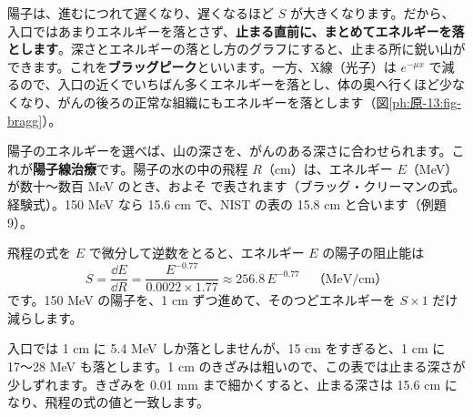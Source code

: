 陽子は、進むにつれて遅くなり、遅くなるほど $S$ が大きくなります。だから、入口ではあまりエネルギーを落とさず、\textbf{止まる直前に、まとめてエネルギーを落とします}。深さとエネルギーの落とし方のグラフにすると、止まる所に鋭い山ができます。これを\textbf{ブラッグピーク}といいます。一方、X線（光子）は $e^{-\mu x}$ で減るので、入口の近くでいちばん多くエネルギーを落とし、体の奥へ行くほど少なくなり、がんの後ろの正常な組織にもエネルギーを落とします（図\ref{ph:原-13:fig-bragg}）。


陽子のエネルギーを選べば、山の深さを、がんのある深さに合わせられます。これが\textbf{陽子線治療}です。陽子の水の中の飛程 $R$（cm）は、エネルギー $E$（MeV）が数十〜数百 MeV のとき、およそ
\label{ph:原-13:bk}で表されます（ブラッグ・クリーマンの式。経験式）。150 MeV なら 15.6 cm で、NIST の表の 15.8 cm と合います（例題9）。

飛程の式を $E$ で微分して逆数をとると、エネルギー $E$ の陽子の阻止能は
\[ S=\frac{\dd E}{\dd R}=\frac{E^{-0.77}}{0.0022\times1.77}\approx256.8\,E^{-0.77}\quad\text{（MeV/cm）} \]
です。150 MeV の陽子を、1 cm ずつ進めて、そのつどエネルギーを $S\times1$ だけ減らします。
\begin{bkcenter}
\label{ph:原-13:tab-bragg}
\end{bkcenter}
入口では 1 cm に 5.4 MeV しか落としませんが、15 cm をすぎると、1 cm に 17〜28 MeV も落とします。1 cm のきざみは粗いので、この表では止まる深さが少しずれます。きざみを 0.01 mm まで細かくすると、止まる深さは 15.6 cm になり、飛程の式の値と一致します。

